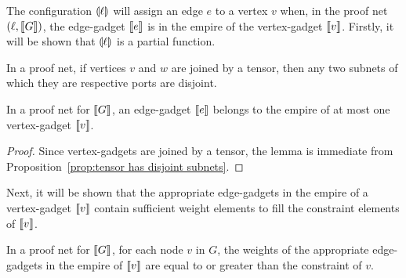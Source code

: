 \documentclass{lmcs}
\begin{document}
The configuration $\llparenthesis\ell\rrparenthesis$ will assign an edge $e$ to a vertex $v$ when, in the proof net $(\ell,\llbracket G\rrbracket)$, the edge-gadget $\llbracket e\rrbracket$ is in the empire of the vertex-gadget $\llbracket v\rrbracket$.
%
Firstly, it will be shown that $\llparenthesis\ell\rrparenthesis$ is a partial function.


\begin{proposition}
\label{prop:tensor has disjoint subnets}
In a proof net, if vertices $v$ and $w$ are joined by a tensor, then any two subnets of which they are respective ports are disjoint.
\end{proposition}


\begin{lemma}
In a proof net for $\llbracket G\rrbracket$, an edge-gadget $\llbracket e\rrbracket$ belongs to the empire of at most one vertex-gadget $\llbracket v\rrbracket$.
\end{lemma}

\begin{proof}
Since vertex-gadgets are joined by a tensor, the lemma is immediate from Proposition~\ref{prop:tensor has disjoint subnets}.
\end{proof}


Next, it will be shown that the appropriate edge-gadgets in the empire of a vertex-gadget $\llbracket v\rrbracket$ contain sufficient weight elements to fill the constraint elements of $\llbracket v\rrbracket$.


\begin{lemma}
\label{lem:appropriate edge weights}
In a proof net for $\llbracket G\rrbracket$, for each node $v$ in $G$, the weights of the appropriate edge-gadgets in the empire of $\llbracket v\rrbracket$ are equal to or greater than the constraint of $v$.
\end{lemma}
\end{document}
